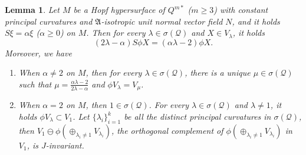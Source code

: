 \documentclass[reqno]{amsart}%
\newtheorem{lemma}[theorem]{Lemma}
\theoremstyle{definition}
\numberwithin{equation}{section}
\begin{document}
\begin{lemma}\label{lemma:5.5}
Let $M$ be a Hopf hypersurface of $Q^{m*}$ ($m\geq3$) with constant principal curvatures
and $\mathfrak{A}$-isotropic unit normal vector field $N$, and it holds $S\xi=\alpha\xi$ ($\alpha\geq0$) on $M$.
Then for every $\lambda\in\sigma(\mathcal{Q})$ and $X\in V_\lambda$, it holds
\begin{equation}\label{eqn:SS1}
(2\lambda-\alpha)S\phi X=(\alpha\lambda-2)\phi X.
\end{equation}
Moreover, we have
%
\begin{enumerate}
\item[(1)]
When $\alpha\neq2$ on $M$, then for every $\lambda\in\sigma(\mathcal{Q})$, there is a unique $\mu\in\sigma(\mathcal{Q})$ such that
$\mu=\tfrac{\alpha\lambda-2}{2\lambda-\alpha}$ and $\phi V_{\lambda}=V_{\mu}$.

\item[(2)]
When $\alpha=2$ on $M$, then $1\in\sigma(\mathcal{Q})$. For every $\lambda\in\sigma(\mathcal{Q})$
and $\lambda\neq1$, it holds
$\phi V_{\lambda}\subset V_{1}$.
Let $\{\lambda_i\}_{i=1}^{k}$ be all the distinct principal curvatures in $\sigma(\mathcal{Q})$,
then $V_1\ominus\phi(\oplus_{\lambda_i\neq1}V_{\lambda_i})$,
the orthogonal complement of
$\phi(\oplus_{\lambda_i\neq1}V_{\lambda_i})$ in $V_1$, is $J$-invariant.
\end{enumerate}
\end{lemma}
\end{document}
